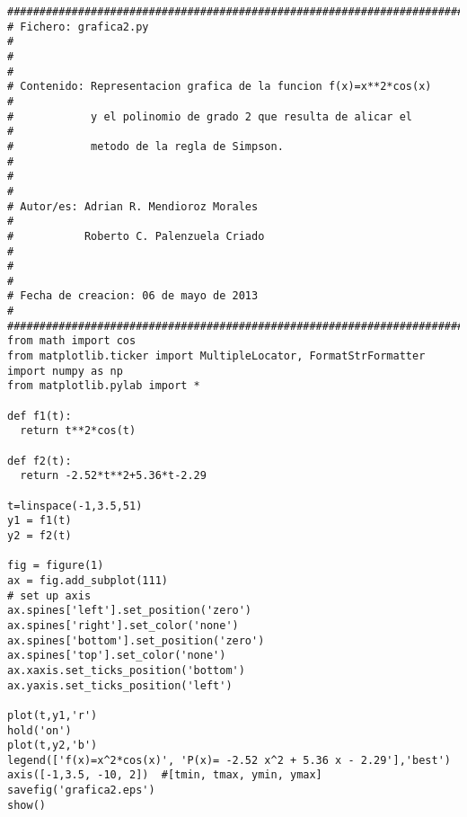 \begin{center}
\begin{footnotesize}
\begin{verbatim}
########################################################################
# Fichero: grafica2.py                                                 #
#                                                                      #
# Contenido: Representacion grafica de la funcion f(x)=x**2*cos(x)     #
#            y el polinomio de grado 2 que resulta de alicar el        #
#            metodo de la regla de Simpson.                            #
#                                                                      #
# Autor/es: Adrian R. Mendioroz Morales                                #
#           Roberto C. Palenzuela Criado                               #
#                                                                      #
# Fecha de creacion: 06 de mayo de 2013                                #
########################################################################
from math import cos
from matplotlib.ticker import MultipleLocator, FormatStrFormatter
import numpy as np
from matplotlib.pylab import *

def f1(t):
  return t**2*cos(t)

def f2(t):
  return -2.52*t**2+5.36*t-2.29

t=linspace(-1,3.5,51)
y1 = f1(t)
y2 = f2(t)
  
fig = figure(1)
ax = fig.add_subplot(111) 
# set up axis
ax.spines['left'].set_position('zero')
ax.spines['right'].set_color('none')
ax.spines['bottom'].set_position('zero')
ax.spines['top'].set_color('none')
ax.xaxis.set_ticks_position('bottom')
ax.yaxis.set_ticks_position('left')
 
plot(t,y1,'r')
hold('on')
plot(t,y2,'b')
legend(['f(x)=x^2*cos(x)', 'P(x)= -2.52 x^2 + 5.36 x - 2.29'],'best')
axis([-1,3.5, -10, 2])  #[tmin, tmax, ymin, ymax]
savefig('grafica2.eps')
show()
\end{verbatim}
\end{footnotesize}
\end{center}

